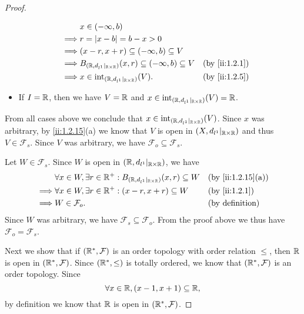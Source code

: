 \begin{proof}
\begin{itemize}
\begin{align*}
                     & x \in (-\infty, b)                                                                            \\
            \implies & r = \abs{x - b} = b - x > 0                                                                   \\
            \implies & (x - r, x + r) \subseteq (-\infty, b) \subseteq V                                             \\
            \implies & B_{(\R, d_{l^1}|_{\R \times \R})}(x, r) \subseteq (-\infty, b) \subseteq V &  & \by{ii:1.2.1} \\
            \implies & x \in \text{int}_{(\R, d_{l^1}|_{\R \times \R})}(V).                       &  & \by{ii:1.2.5}
          \end{align*}
    \item If \(I = \mathbb{R}\), then we have \(V = \mathbb{R}\) and \(x \in \text{int}_{(\mathbb{R}, d_{l^1}|_{\mathbb{R} \times \mathbb{R}})}(V) = \mathbb{R}\).
  \end{itemize}
  From all cases above we conclude that \(x \in \text{int}_{(\mathbb{R}, d_{l^1}|_{\mathbb{R} \times \mathbb{R}})}(V)\).
  Since \(x\) was arbitrary, by \cref{ii:1.2.15}(a) we know that \(V\) is open in \((X, d_{l^1}|_{\mathbb{R} \times \mathbb{R}})\) and thus \(V \in \mathcal{F}_s\).
  Since \(V\) was arbitrary, we have \(\mathcal{F}_o \subseteq \mathcal{F}_s\).

  Let \(W \in \mathcal{F}_s\).
  Since \(W\) is open in \((\mathbb{R}, d_{l^1}|_{\mathbb{R} \times \mathbb{R}})\), we have
  \begin{align*}
             & \forall x \in W, \exists r \in \R^+ : B_{(\R, d_{l^1}|_{\R \times \R})}(x, r) \subseteq W &  & \by{ii:1.2.15}[a]      \\
    \implies & \forall x \in W, \exists r \in \R^+ : (x - r, x + r) \subseteq W                          &  & \by{ii:1.2.1}          \\
    \implies & W \in \mathcal{F}_o.                                                                      &  & \text{(by definition)}
  \end{align*}
  Since \(W\) was arbitrary, we have \(\mathcal{F}_s \subseteq \mathcal{F}_o\).
  From the proof above we thus have \(\mathcal{F}_o = \mathcal{F}_s\).

  Next we show that if \((\mathbb{R}^*, \mathcal{F})\) is an order topology with order relation \(\leq\), then \(\mathbb{R}\) is open in \((\mathbb{R}^*, \mathcal{F})\).
  Since \((\mathbb{R}^*, \leq)\) is totally ordered, we know that \((\mathbb{R}^*, \mathcal{F})\) is an order topology.
  Since
  \[
    \forall x \in \mathbb{R}, (x - 1, x + 1) \subseteq \mathbb{R},
  \]
  by definition we know that \(\mathbb{R}\) is open in \((\mathbb{R}^*, \mathcal{F})\).


\end{proof}
